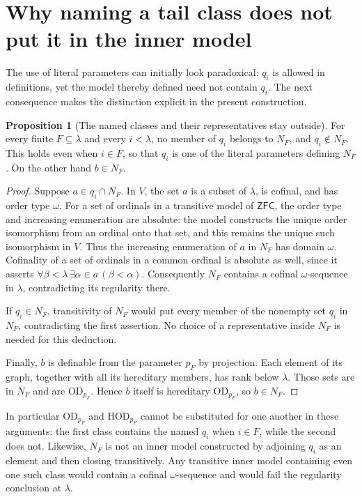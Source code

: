 \documentclass[11pt,letterpaper]{article}
\theoremstyle{definition}
\newtheorem{proposition}[definition]{Proposition}
\numberwithin{equation}{section}
\newcommand{\ZFC}{\mathsf{ZFC}}
\newcommand{\HOD}{\mathrm{HOD}}
\newcommand{\OD}{\mathrm{OD}}
\begin{document}
\section{Why naming a tail class does not put it in the inner model}\label{app:membership}

The use of literal parameters can initially look paradoxical: $q_i$ is allowed in definitions, yet the model thereby defined need not contain $q_i$. The next consequence makes the distinction explicit in the present construction.

\begin{proposition}[The named classes and their representatives stay outside]\label{prop:outside}
For every finite $F\subseteq\lambda$ and every $i<\lambda$, no member of $q_i$ belongs to $N_F$, and $q_i\notin N_F$. This holds even when $i\in F$, so that $q_i$ is one of the literal parameters defining $N_F$. On the other hand $b\in N_F$.
\end{proposition}

\begin{proof}
Suppose $a\in q_i\cap N_F$. In $V$, the set $a$ is a subset of $\lambda$, is cofinal, and has order type $\omega$. For a set of ordinals in a transitive model of $\ZFC$, the order type and increasing enumeration are absolute: the model constructs the unique order isomorphism from an ordinal onto that set, and this remains the unique such isomorphism in $V$. Thus the increasing enumeration of $a$ in $N_F$ has domain $\omega$. Cofinality of a set of ordinals in a common ordinal is absolute as well, since it asserts $\forall\beta<\lambda\,\exists\alpha\in a\,(\beta<\alpha)$. Consequently $N_F$ contains a cofinal $\omega$-sequence in $\lambda$, contradicting its regularity there.

If $q_i\in N_F$, transitivity of $N_F$ would put every member of the nonempty set $q_i$ in $N_F$, contradicting the first assertion. No choice of a representative inside $N_F$ is needed for this deduction.

Finally, $b$ is definable from the parameter $p_F$ by projection. Each element of its graph, together with all its hereditary members, has rank below $\lambda$. Those sets are in $N_F$ and are $\OD_{p_F}$. Hence $b$ itself is hereditary $\OD_{p_F}$, so $b\in N_F$.
\end{proof}

In particular $\OD_{p_F}$ and $\HOD_{p_F}$ cannot be substituted for one another in these arguments: the first class contains the named $q_i$ when $i\in F$, while the second does not. Likewise, $N_F$ is not an inner model constructed by adjoining $q_i$ as an element and then closing transitively. Any transitive inner model containing even one such class would contain a cofinal $\omega$-sequence and would fail the regularity conclusion at $\lambda$.
\end{document}
